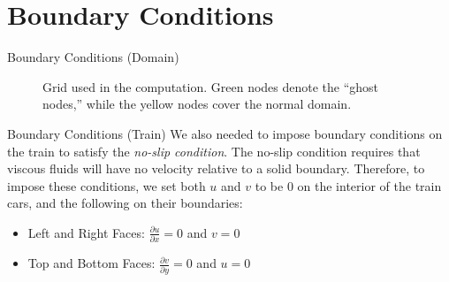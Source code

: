 \documentclass[pdf]{beamer}
\begin{document}
\section{Boundary Conditions}
\begin{frame}{Boundary Conditions (Domain)}
\begin{figure}[H]
\centering
{}
\caption{Grid used in the computation. Green nodes denote the ``ghost nodes,'' while the yellow nodes cover the normal domain.}
\label{fig:grid}
\end{figure}
\end{frame}

\begin{frame}{Boundary Conditions (Train)}
We also needed to impose boundary conditions on the train to satisfy the {\em no-slip condition}. The no-slip condition requires that viscous fluids will have no velocity relative to a solid boundary. Therefore, to impose these conditions, we set both $u$ and $v$ to be $0$ on the interior of the train cars, and the following on their boundaries:
\begin{itemize}
\item Left and Right Faces: $\frac{\partial u}{\partial x} = 0$ and $v = 0$
\item Top and Bottom Faces: $\frac{\partial v}{\partial y} = 0$ and $u = 0$
\end{itemize}
\end{frame}
\end{document}

